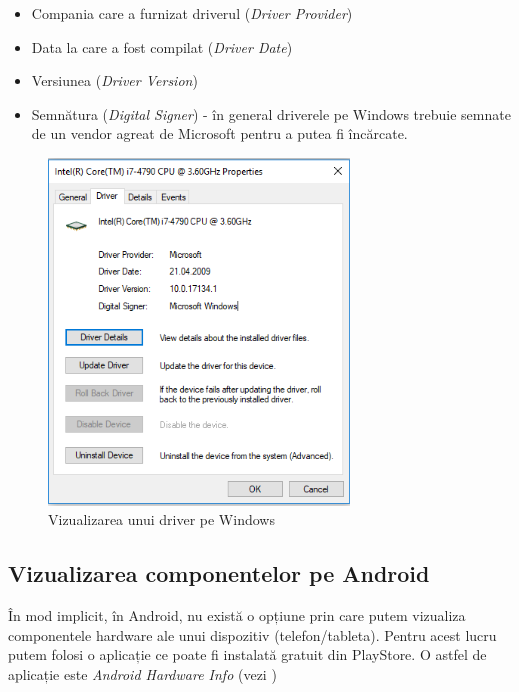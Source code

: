 \begin{itemize}
	\item Compania care a furnizat driverul (\textit{Driver Provider})
	\item Data la care a fost compilat (\textit{Driver Date})
	\item Versiunea (\textit{Driver Version})
	\item Semnătura (\textit{Digital Signer}) - în general driverele pe
		Windows trebuie semnate de un vendor agreat de Microsoft pentru
		a putea fi încărcate.
\end{itemize}

\begin{figure}[!htbp]
	\centering
	\includegraphics[width=8cm]{chapters/08-hw/img/driver-virt-img.png}
	\caption{Vizualizarea unui driver pe Windows}
	\label{fig:hw-driver-virt}
\end{figure}

\subsection{Vizualizarea componentelor pe Android}
\label{sec:hardware-virtualizare-android}

În mod implicit, în Android, nu există o opțiune prin care putem vizualiza
componentele hardware ale unui dispozitiv (telefon/tableta). Pentru acest lucru
putem folosi o aplicație ce poate fi instalată gratuit din PlayStore. O astfel
de aplicație este \textit{Android Hardware Info} (vezi
)

